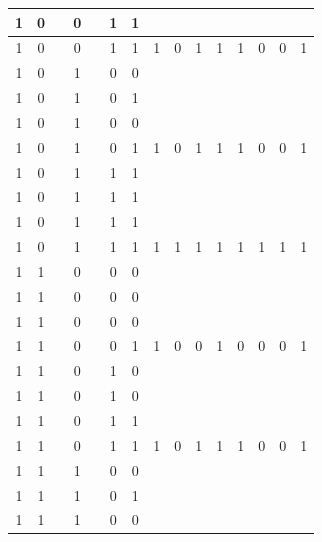 \begin{table}[!tb]
\begin{tabular}{|c|c|c|c|c|c|c|c|c|c|c|c|c|c|c|}
        \rowcolor{yellow!40} 1 & 0 &  & 0 &  & 1 & 1 &  &  &  &  &  &  &  &  \\ \hline
        \rowcolor{yellow!40} 1 & 0 &  & 0 &  & 1 & 1 & 1 & 0 & 1 & 1 & 1 & 0 & 0 & 1 \\ \hline
        \rowcolor{gray!40} 1 & 0 &  & 1 &  & 0 & 0 &  &  &  &  &  &  &  &  \\ \hline
        \rowcolor{gray!40} 1 & 0 &  & 1 &  & 0 & 1 &  &  &  &  &  &  &  &  \\ \hline
        \rowcolor{gray!40} 1 & 0 &  & 1 &  & 0 & 0 &  &  &  &  &  &  &  &  \\ \hline
        \rowcolor{gray!40} 1 & 0 &  & 1 &  & 0 & 1 & 1 & 0 & 1 & 1 & 1 & 0 & 0 & 1 \\ \hline
        \rowcolor{blue!40} 1 & 0 &  & 1 &  & 1 & 1 &  &  &  &  &  &  &  &  \\ \hline
        \rowcolor{blue!40} 1 & 0 &  & 1 &  & 1 & 1 &  &  &  &  &  &  &  &  \\ \hline
        \rowcolor{blue!40} 1 & 0 &  & 1 &  & 1 & 1 &  &  &  &  &  &  &  &  \\ \hline
        \rowcolor{blue!40} 1 & 0 &  & 1 &  & 1 & 1 & 1 & 1 & 1 & 1 & 1 & 1 & 1 & 1 \\ \hline
        \rowcolor{red!40} 1 & 1 &  & 0 &  & 0 & 0 &  &  &  &  &  &  &  &  \\ \hline
        \rowcolor{red!40} 1 & 1 &  & 0 &  & 0 & 0 &  &  &  &  &  &  &  &  \\ \hline
        \rowcolor{red!40} 1 & 1 &  & 0 &  & 0 & 0 &  &  &  &  &  &  &  &  \\ \hline
        \rowcolor{red!40} 1 & 1 &  & 0 &  & 0 & 1 & 1 & 0 & 0 & 1 & 0 & 0 & 0 & 1 \\ \hline
        \rowcolor{green!40} 1 & 1 &  & 0 &  & 1 & 0 &  &  &  &  &  &  &  &  \\ \hline
        \rowcolor{green!40} 1 & 1 &  & 0 &  & 1 & 0 &  &  &  &  &  &  &  &  \\ \hline
        \rowcolor{green!40} 1 & 1 &  & 0 &  & 1 & 1 &  &  &  &  &  &  &  &  \\ \hline
        \rowcolor{green!40} 1 & 1 &  & 0 &  & 1 & 1 & 1 & 0 & 1 & 1 & 1 & 0 & 0 & 1 \\ \hline
        \rowcolor{yellow!40} 1 & 1 &  & 1 &  & 0 & 0 &  &  &  &  &  &  &  &  \\ \hline
        \rowcolor{yellow!40} 1 & 1 &  & 1 &  & 0 & 1 &  &  &  &  &  &  &  &  \\ \hline
        \rowcolor{yellow!40} 1 & 1 &  & 1 &  & 0 & 0 &  &  &  &  &  &  &  &  \\ \hline

\end{tabular}
\end{table}
